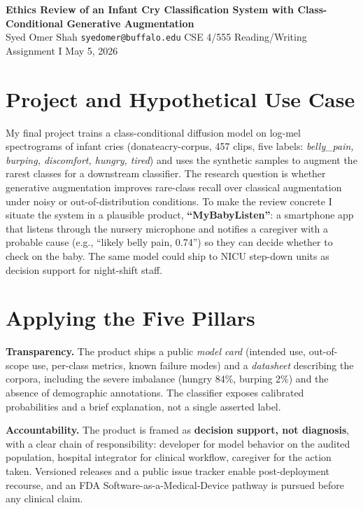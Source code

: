 \documentclass[11pt]{article}
\begin{document}
\begin{center}
{\large\bfseries Ethics Review of an Infant Cry Classification System with Class-Conditional Generative Augmentation}\\[2pt]
{\small Syed Omer Shah \quad\textbar\quad \texttt{syedomer@buffalo.edu} \quad\textbar\quad CSE 4/555 Reading/Writing Assignment I \quad\textbar\quad May 5, 2026}
\end{center}
\vspace{-0.5em}

\section*{Project and Hypothetical Use Case}
My final project trains a class-conditional diffusion model on log-mel spectrograms of infant cries (donateacry-corpus, 457 clips, five labels: \textit{belly\_pain, burping, discomfort, hungry, tired}) and uses the synthetic samples to augment the rarest classes for a downstream classifier. The research question is whether generative augmentation improves rare-class recall over classical augmentation under noisy or out-of-distribution conditions. To make the review concrete I situate the system in a plausible product, \textbf{``MyBabyListen''}: a smartphone app that listens through the nursery microphone and notifies a caregiver with a probable cause (e.g., ``likely belly pain, 0.74'') so they can decide whether to check on the baby. The same model could ship to NICU step-down units as decision support for night-shift staff.

\section*{Applying the Five Pillars}

\textbf{Transparency.} The product ships a public \textit{model card} (intended use, out-of-scope use, per-class metrics, known failure modes) and a \textit{datasheet} describing the corpora, including the severe imbalance (hungry 84\%, burping 2\%) and the absence of demographic annotations. The classifier exposes calibrated probabilities and a brief explanation, not a single asserted label.

\textbf{Accountability.} The product is framed as \textbf{decision support, not diagnosis}, with a clear chain of responsibility: developer for model behavior on the audited population, hospital integrator for clinical workflow, caregiver for the action taken. Versioned releases and a public issue tracker enable post-deployment recourse, and an FDA Software-as-a-Medical-Device pathway is pursued before any clinical claim.
\end{document}

